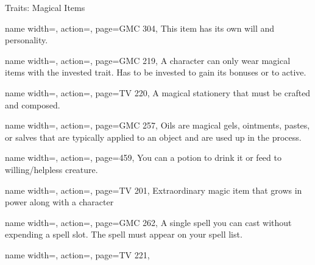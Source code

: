 \begin{PageBackLandscape}
\begin{TablesHalf}{\backTableHeight}
\begin{Table}{Traits: Magical Items}
\begin{entry}{}{%
                name width=\conditionLength,%
                action=\Intelligent,
                page=GMC 304,
            }
                This item has its own will and personality.
            \end{entry}
            \begin{entry}{}{%
                name width=\conditionLength,%
                action=\Invested,
                page=GMC 219,
            }
                A character can only wear  magical items with the invested trait.
                Has to be invested to gain its bonuses or to active.
            \end{entry}
            \begin{entry}{}{%
                name width=\conditionLength,%
                action=\Missive,
                page=TV 220,
            }
                A magical stationery that must be crafted and composed.
            \end{entry}
            \begin{entry}{}{%
                name width=\conditionLength,%
                action=\Oil,
                page=GMC 257,
            }
                Oils are magical gels, ointments, pastes, or salves that are typically applied to an object and are used up in the process.
            \end{entry}
            \begin{entry}{}{%
                name width=\conditionLength,%
                action=\Potion,
                page=459,
            }
                You can  a potion to drink it or feed to willing/helpless creature.\hfill
            \end{entry}
            \begin{entry}{}{%
                name width=\conditionLength,%
                action=\Relic,
                page=TV 201,
            }
                Extraordinary magic item that grows in power along with a character
            \end{entry}
            \begin{entry}{}{%
                name width=\conditionLength,%
                action=\Scroll,
                page=GMC 262,
            }
                A single spell you can cast without expending a spell slot.
                The spell must appear on your spell list.\hfill
            \end{entry}
            \begin{entry}{}{%
                name width=\conditionLength,%
                action=\Spellgun,
                page=TV 221,
            }

\end{entry}
\end{Table}
\end{TablesHalf}
\end{PageBackLandscape}
